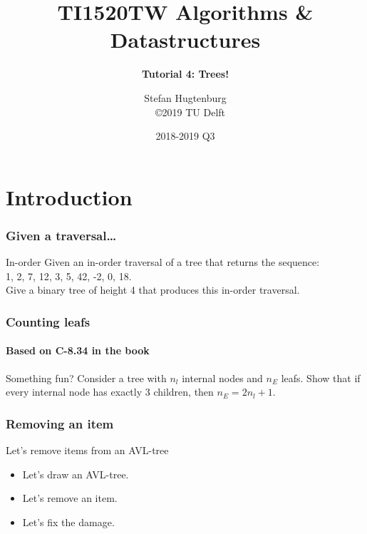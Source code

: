 \documentclass[aspectratio=169]{beamer}
\title[Algorithms \& Datastructures]{TI1520TW Algorithms \& Datastructures}
\subtitle{\color{cyan} \textbf{Tutorial 4: Trees!}}
\author{Stefan Hugtenburg\\ {\tiny{\qquad~~\copyright 2019 TU Delft}}}
\institute{CSE Teaching Team | EEMCS | TU Delft}
\date{2018-2019 Q3}
\begin{document}
\frame{\titlepage}

\section{Introduction}



\begin{frame}
	\frametitle{Given a traversal\dots}
	
	\begin{problemblock}{In-order}
		Given an in-order traversal of a tree that returns the sequence:\\
		1, 2, 7, 12, 3, 5, 42, -2, 0, 18.\\
		Give a binary tree of height 4 that produces this in-order traversal.
	\end{problemblock}
\end{frame}

\begin{frame}
	\frametitle{Counting leafs}
	\framesubtitle{Based on C-8.34 in the book}
	\begin{problemblock}{Something fun?}
		Consider a tree with $n_l$ internal nodes and $n_E$ leafs. Show that if every internal node has exactly 3 children,
		then $n_E = 2n_l + 1$.
	\end{problemblock}
\end{frame}

\begin{frame}
	\frametitle{Removing an item}
	\begin{problemblock}{Let's remove items from an AVL-tree}
		\begin{itemize}
			\item Let's draw an AVL-tree.
			\item Let's remove an item.
			\item Let's fix the damage.
		\end{itemize}
	\end{problemblock}
\end{frame}

\frame{\titlepage}
\end{document}
